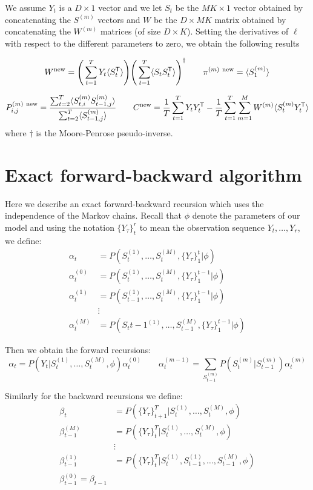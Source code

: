 \documentclass{article}
\begin{document}
We assume $Y_t$ is a $D \times 1$ vector and we let $S_t$ be the $MK \times 1$ vector obtained by concatenating the $S^{(m)}$ vectors and $W$ be the $D \times MK$ matrix obtained by concatenating the $W^{(m)}$ matrices (of size $D \times K$). Setting the derivatives of $\ell$ with respect to the different parameters to zero, we obtain the following results

\[ W^\textnormal{new} = \Bigg( \sum_{t=1}^T Y_t \langle S_{t}^\mathsf{T} \rangle \Bigg) \Bigg( \sum_{t=1}^T \langle S_{t} S_{t}^\mathsf{T} \rangle \Bigg)^\dagger \qquad \pi^{(m) \ \textnormal{new}} = \langle S_{1}^{(m)}  \rangle\]

\[ P_{i,j}^{(m) \ \textnormal{new}} = \frac{\sum_{t=2}^T \langle S_{t,i}^{(m)} S_{t-1,j}^{(m)}  \rangle}{\sum_{t=2}^T \langle S_{t-1,j}^{(m)}  \rangle} \qquad C^{\textnormal{new}} = \frac{1}{T} \sum_{t=1}^T Y_t Y_t^\mathsf{T} - \frac{1}{T} \sum_{t=1}^T \sum_{m=1}^M W^{(m)} \langle S_t^{(m)} Y_t^\mathsf{T} \rangle \]
where $\dagger$ is the Moore-Penrose pseudo-inverse.

\section{Exact forward-backward algorithm}

Here we describe an exact forward-backward recursion which uses the independence of the Markov chains. Recall that $\phi$ denote the parameters of our model and using the notation $\{ Y_\tau \}_t^r$ to mean the observation sequence $Y_t,\dots,Y_r$, we define:
\begin{align*}
\alpha_t &= P(S_t^{(1)},\dots,S_t^{(M)}, \{Y_\tau \}_1^t | \phi) \\
\alpha_t^{(0)} &= P(S_t^{(1)},\dots,S_t^{(M)}, \{Y_\tau \}_1^{t-1} | \phi) \\
\alpha_t^{(1)} &= P(S_{t-1}^{(1)},\dots,S_t^{(M)}, \{Y_\tau \}_1^{t-1} | \phi) \\
&\vdots \\
\alpha_t^{(M)} &= P(S_t{t-1}^{(1)},\dots,S_{t-1}^{(M)}, \{Y_\tau \}_1^{t-1} | \phi)
\end{align*}

Then we obtain the forward recursions:
\[ \alpha_t = P(Y_t | S_t^{(1)},\dots,S_t^{(M)}, \phi) \alpha_t^{(0)} \qquad \alpha_t^{(m-1)} = \sum_{S_{t-1}^{(m)}} P(S_t^{(m)} | S_{t-1}^{(m)}) \alpha_t^{(m)} \]

Similarly for the backward recursions we define:
\begin{align*}
\beta_t &= P(\{Y_\tau \}_{t+1}^T | S_t^{(1)},\dots,S_t^{(M)}, \phi) \\
\beta_{t-1}^{(M)} &= P(\{Y_\tau \}_{t}^T | S_t^{(1)},\dots,S_t^{(M)}, \phi) \\
&\vdots \\ 
\beta_{t-1}^{(1)} &= P(\{Y_\tau \}_{t}^T | S_t^{(1)}, S_{t-1}^{(1)}, \dots,S_{t-1}^{(M)}, \phi) \\
\beta_{t-1}^{(0)} = \beta_{t-1}
\end{align*}
\end{document}
